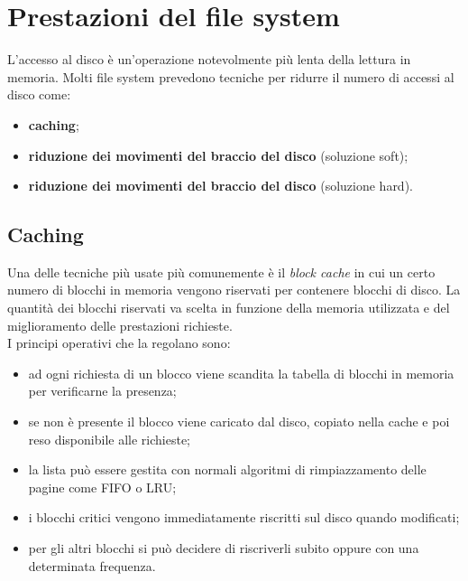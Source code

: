 \documentclass[12pt, letterpaper]{report}
\begin{document}
	\section{Prestazioni del file system}
	L'accesso al disco è un'operazione notevolmente più lenta della lettura in memoria. Molti file system prevedono tecniche per ridurre il numero di accessi al disco come:
	\begin{itemize}
		\item \textbf{caching};
		\item \textbf{riduzione dei movimenti del braccio del disco} (soluzione soft);
		\item \textbf{riduzione dei movimenti del braccio del disco} (soluzione hard).
	\end{itemize}
	\subsection{Caching} Una delle tecniche più usate più comunemente è il \textit{block cache} in cui un certo numero di blocchi in memoria vengono riservati per contenere blocchi di disco. La quantità dei blocchi riservati va scelta in funzione della memoria utilizzata e del miglioramento delle prestazioni richieste. \\
	I principi operativi che la regolano sono:
	\begin{itemize}
		\item ad ogni richiesta di un blocco viene scandita la tabella di blocchi in memoria per verificarne la presenza;
		\item se non è presente il blocco viene caricato dal disco, copiato nella cache e poi reso disponibile alle richieste;
		\item la lista può essere gestita con normali algoritmi di rimpiazzamento delle pagine come FIFO o LRU;
		\item i blocchi critici vengono immediatamente riscritti sul disco quando modificati;
		\item per gli altri blocchi si può decidere di riscriverli subito oppure con una determinata frequenza.
	\end{itemize}
\end{document}
